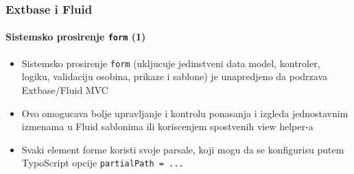 \begin{frame}[fragile]
	\frametitle{Extbase i Fluid}
	\framesubtitle{Sistemsko prosirenje \texttt{form} (1)}

	\begin{itemize}

		\item Sistemsko prosirenje \texttt{form} (ukljucuje jedinstveni data model, kontroler, logiku, validaciju osobina, prikaze i sablone) je unapredjeno da podrzava Extbase/Fluid MVC 

		\item Ovo omogucava bolje upravljanje i kontrolu ponasanja i izgleda jednostavnim izmenama u Fluid sablonima ili koriscenjem spostvenih view helper-a

		\item Svaki element forme koristi svoje parsale, koji mogu da se konfigurisu putem 
			TypoScript opcije \texttt{partialPath = ...}

	\end{itemize}

\end{frame}


